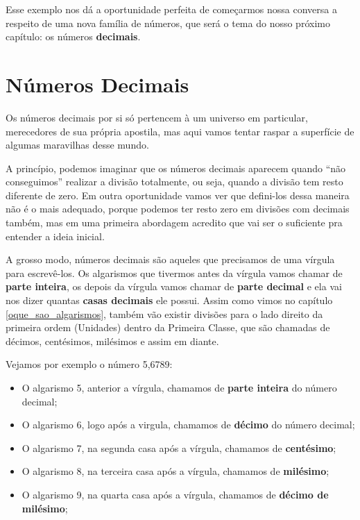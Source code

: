 Esse exemplo nos dá a oportunidade perfeita de começarmos nossa conversa a respeito de uma nova família de números, que será o tema do nosso próximo capítulo: os números \textbf{decimais}.

\newpage
\section{Números Decimais}

Os números decimais por si só pertencem à um universo em particular, merecedores de sua própria apostila, mas aqui vamos tentar raspar a superfície de algumas maravilhas desse mundo. 

A princípio, podemos imaginar que os números decimais aparecem quando ``não conseguimos'' realizar a divisão totalmente, ou seja, quando a divisão tem resto diferente de zero. Em outra oportunidade vamos ver que defini-los dessa maneira não é o mais adequado, porque podemos ter resto zero em divisões com decimais também, mas em uma primeira abordagem acredito que vai ser o suficiente pra entender a ideia inicial. 

A grosso modo, números decimais são aqueles que precisamos de uma vírgula para escrevê-los. Os algarismos que tivermos antes da vírgula vamos chamar de \textbf{parte inteira}, os depois da vírgula vamos chamar de \textbf{parte decimal} e ela vai nos dizer quantas \textbf{casas decimais} ele possui. Assim como vimos no capítulo \ref{oque_sao_algarismos}, também vão existir divisões para o lado direito da primeira ordem (Unidades) dentro da Primeira Classe, que são chamadas de décimos, centésimos, milésimos e assim em diante.

Vejamos por exemplo o número 5,6789:

\begin{itemize}
    \item O algarismo 5, anterior a vírgula, chamamos de \textbf{parte inteira} do número decimal;
    \item O algarismo 6, logo após a virgula, chamamos de \textbf{décimo} do número decimal;
    \item O algarismo 7, na segunda casa após a vírgula, chamamos de \textbf{centésimo};
    \item O algarismo 8, na terceira casa após a vírgula, chamamos de \textbf{milésimo};
    \item O algarismo 9, na quarta casa após a vírgula, chamamos de \textbf{décimo de milésimo};
\end{itemize}

